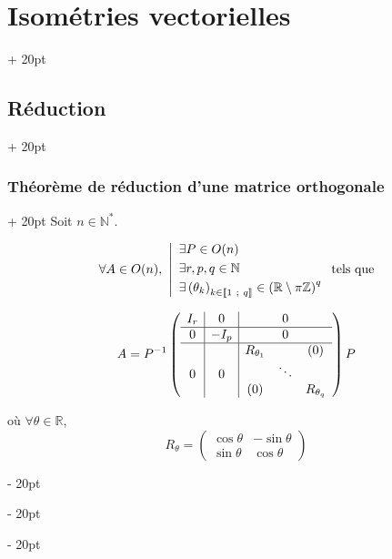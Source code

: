 \documentclass[a4paper, 12pt, twoside]{article}
\newcommand{\N}{\mathbb{N}} %
\newcommand{\Z}{\mathbb{Z}} %
\newcommand{\R}{\mathbb{R}} %
\newcommand{\nset}[2]{\left\llbracket #1\ ;\ #2 \right\rrbracket}
\newcommand{\lr}[1]{\left( #1 \right)}
\newcommand{\ind}[1][20pt]{\advance\leftskip + #1}
\newcommand{\deind}[1][20pt]{\advance\leftskip - #1}
\newenvironment{indt}[2][20pt]{#2 \par \ind[#1]}{\par \deind} %
\begin{document}
\begin{indt}{\section{Isométries vectorielles}}
\begin{indt}{\subsection{Réduction}}
            \begin{indt}{\subsubsection{Théorème de réduction d'une matrice orthogonale}}
                Soit $n \in \N^*$.

                \[
                    \forall A \in O(n),\
                    \left|
                    \begin{array}{l}
                        \exists P \in O(n)
                        \vspace{3pt}
                        \\
                        \exists r, p, q \in \N
                        \vspace{3pt}
                        \\
                        \exists \lr{\theta_k}_{k \in \nset 1 q} \in \lr{\R \setminus \pi \Z}^q
                    \end{array}
                    \right.
                    \text{tels que}
                \]

                \[
                    A =
                    P^{-1}
                    \left(
                    \begin{array}{c|c|ccc}
                        I_r & 0 && 0
                        \\
                        \hline
                        0 & -I_p && 0
                        \\
                        \hline
                        && R_{\theta_1} && (0)
                        \\
                        0 & 0 && \ddots
                        \\
                        && (0) && R_{\theta_q}
                    \end{array}
                    \right)
                    P
                \]

                où $\forall \theta \in \R$,
                \[
                    R_\theta =
                    \begin{pmatrix}
                        \cos \theta & -\sin \theta
                        \\
                        \sin \theta & \cos \theta
                    \end{pmatrix}
                \]
            \end{indt}


\end{indt}
\end{indt}
\end{document}
